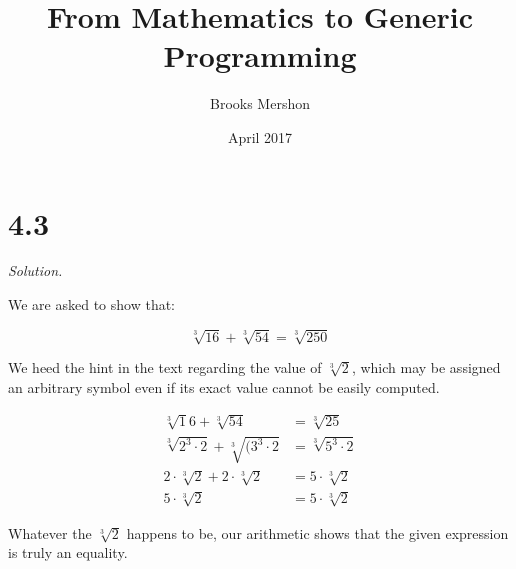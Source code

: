 \documentclass{article}
\title{From Mathematics to Generic Programming}
\author{Brooks Mershon}
\date{April 2017}
\begin{document}
\maketitle

\section*{4.3}


\textit{Solution.}

\bigskip

We are asked to show that:

$$ \sqrt[3]{16} + \sqrt[3]{54} = \sqrt[3]{250}$$

We heed the hint in the text regarding the value of $\sqrt[3]2$, which may be assigned an arbitrary symbol even if its exact value cannot be easily computed.

\begin{align*}
\sqrt[3]16 + \sqrt[3]{54} &= \sqrt[3]{25} \\
\sqrt[3]{2^3 \cdot 2} + \sqrt[3]{(3^3 \cdot 2} &= \sqrt[3]{5^3 \cdot 2} \\
2 \cdot \sqrt[3]{2} + 2 \cdot \sqrt[3]{2} &= 5 \cdot \sqrt[3]{2} \\
5 \cdot \sqrt[3]{2} &= 5 \cdot \sqrt[3]{2}
\end{align*}

Whatever the $\sqrt[3]{2}$ happens to be, our arithmetic shows that the given expression is truly an equality.
\end{document}
